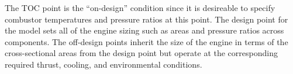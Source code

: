 \documentclass[conf]{new-aiaa}
\begin{document}
The TOC point is the ``on-design'' condition since it is desireable to specify combustor temperatures and pressure ratios at this point.
The design point for the model sets all of the engine sizing such as areas and pressure ratios across components.
The off-design points inherit the size of the engine in terms of the cross-sectional areas from the design point but operate at the corresponding required thrust, cooling, and environmental conditions.

\end{document}
